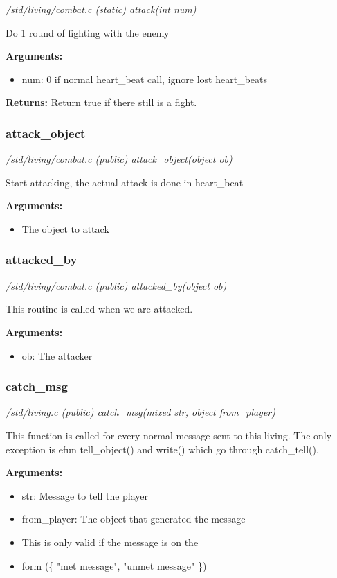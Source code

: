 {\em /std/living/combat.c (static) attack(int num)}

Do 1 round of fighting with the enemy

{\bf Arguments:}
\begin{itemize}
\item      num: 0 if normal heart\_beat call, ignore lost heart\_beats
\end{itemize}

{\bf Returns:}        Return true if there still is a fight.


\subsubsection{attack\_object}

{\em /std/living/combat.c (public) attack\_object(object ob)}

Start attacking, the actual attack is done in heart\_beat

{\bf Arguments:}
\begin{itemize}
\item     The object to attack
\end{itemize}


\subsubsection{attacked\_by}

{\em /std/living/combat.c (public) attacked\_by(object ob)}

This routine is called when we are attacked.

{\bf Arguments:}
\begin{itemize}
\item      ob: The attacker
\end{itemize}


\subsubsection{catch\_msg}

{\em /std/living.c (public) catch\_msg(mixed str, object from\_player)}

This function is called for every normal message sent
to this living. The only exception is efun tell\_object()
and write() which go through catch\_tell().

{\bf Arguments:}
\begin{itemize}
\item      str:       Message to tell the player
\item from\_player: The object that generated the message
\item This is only valid if the message is on the
\item form (\{ "met message", "unmet message" \})
\end{itemize}


